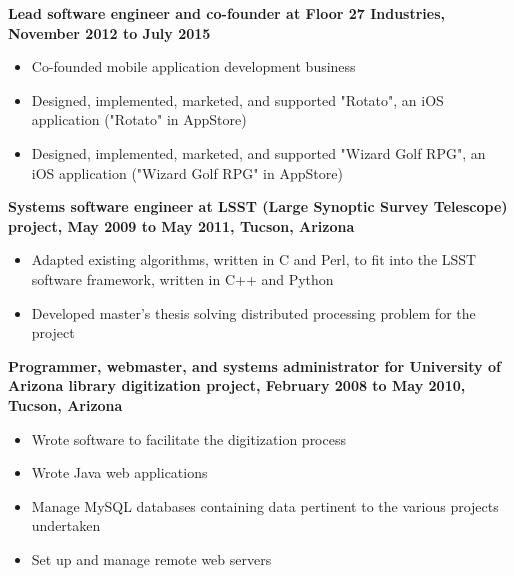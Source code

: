 \documentclass[10pt]{res}
\begin{document}
\begin{resume}
\begin{flushleft}
{\bf Lead software engineer and co-founder at Floor 27 Industries, November 2012 to July 2015}
\end{flushleft}

\begin{itemize}
\setlength{\itemsep}{1pt}
\setlength{\parskip}{0pt}
\setlength{\parsep}{0pt}
\item Co-founded mobile application development business
\item Designed, implemented, marketed, and supported "Rotato", an iOS application ("Rotato" in AppStore)
\item Designed, implemented, marketed, and supported "Wizard Golf RPG", an iOS application ("Wizard Golf RPG" in AppStore)
\end{itemize}

\begin{flushleft}
{\bf Systems software engineer at LSST (Large Synoptic Survey Telescope) project, May 2009 to May 2011, Tucson, Arizona}
\end{flushleft}

\begin{itemize}
\setlength{\itemsep}{1pt}
\setlength{\parskip}{0pt}
\setlength{\parsep}{0pt}
\item Adapted existing algorithms, written in C and Perl, to fit into the LSST software framework, written in C++ and Python
\item Developed master's thesis  solving distributed processing problem for the project
\end{itemize}


\begin{flushleft}
{\bf Programmer, webmaster, and systems administrator for University of Arizona library digitization project, February 2008 to May 2010, Tucson, Arizona}
\end{flushleft}

\begin{itemize}
\setlength{\itemsep}{1pt}
\setlength{\parskip}{0pt}
\setlength{\parsep}{0pt}
\item Wrote software to facilitate the digitization process
\item Wrote Java web applications
\item Manage MySQL databases containing data pertinent to the various projects undertaken
\item Set up and manage remote web servers
\end{itemize}


\end{resume}
\end{document}
